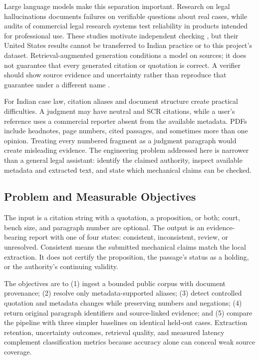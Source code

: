 \documentclass[conference]{IEEEtran}
\begin{document}
Large language models make this separation important. Research on legal hallucinations documents failures on verifiable questions about real cases, while audits of commercial legal research systems test reliability in products intended for professional use. These studies motivate independent checking \cite{ref1,ref2}, but their United States results cannot be transferred to Indian practice or to this project's dataset. Retrieval-augmented generation conditions a model on sources; it does not guarantee that every generated citation or quotation is correct. A verifier should show source evidence and uncertainty rather than reproduce that guarantee under a different name \cite{ref3,ref4}.

For Indian case law, citation aliases and document structure create practical difficulties. A judgment may have neutral and SCR citations, while a user's reference uses a commercial reporter absent from the available metadata. PDFs include headnotes, page numbers, cited passages, and sometimes more than one opinion. Treating every numbered fragment as a judgment paragraph would create misleading evidence. The engineering problem addressed here is narrower than a general legal assistant: identify the claimed authority, inspect available metadata and extracted text, and state which mechanical claims can be checked.

\subsection{Problem and Measurable Objectives}
The input is a citation string with a quotation, a proposition, or both; court, bench size, and paragraph number are optional. The output is an evidence-bearing report with one of four states: consistent, inconsistent, review, or unresolved. Consistent means the submitted mechanical claims match the local extraction. It does not certify the proposition, the passage's status as a holding, or the authority's continuing validity.

The objectives are to (1) ingest a bounded public corpus with document provenance; (2) resolve only metadata-supported aliases; (3) detect controlled quotation and metadata changes while preserving numbers and negations; (4) return original paragraph identifiers and source-linked evidence; and (5) compare the pipeline with three simpler baselines on identical held-out cases. Extraction retention, uncertainty outcomes, retrieval quality, and measured latency complement classification metrics because accuracy alone can conceal weak source coverage.
\end{document}
